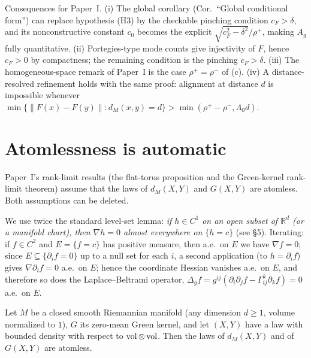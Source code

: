 \begin{remark}
Consequences for Paper~I. (i) The global corollary (Cor.\ ``Global conditional form'')
can replace hypothesis (H3) by the checkable pinching condition $c_F>\delta$, and its
nonconstructive constant $c_0$ becomes the explicit
$\sqrt{c_F^2-\delta^2}/\rho^+$, making $A_g$ fully quantitative. (ii) Portegies-type
mode counts give injectivity of $F$, hence $c_F>0$ by compactness; the remaining
condition is the pinching $c_F>\delta$. (iii) The homogeneous-space remark of Paper~I
is the case $\rho^+=\rho^-$ of (c). (iv) A distance-resolved refinement holds with the
same proof: alignment at distance $d$ is impossible whenever
$\min\{\lVert F(x)-F(y)\rVert:d_M(x,y)=d\}>\min(\rho^+-\rho^-,\Lambda_0 d)$.
\end{remark}

\section{Atomlessness is automatic}

Paper~I's rank-limit results (the flat-torus proposition and the Green-kernel rank-limit
theorem) assume that the laws of $d_M(X,Y)$ and $G(X,Y)$ are atomless. Both assumptions
can be deleted.

We use twice the standard level-set lemma: \emph{if $h\in C^1$ on an open subset of
$\mathbb R^d$ (or a manifold chart), then $\nabla h=0$ almost everywhere on
$\{h=c\}$} (see \S5). Iterating: if $f\in C^2$ and $E=\{f=c\}$ has positive measure,
then a.e.\ on $E$ we have $\nabla f=0$; since $E\subseteq\{\partial_i f=0\}$ up to a
null set for each $i$, a second application (to $h=\partial_i f$) gives
$\nabla\partial_i f=0$ a.e.\ on $E$; hence the coordinate Hessian vanishes a.e.\ on
$E$, and therefore so does the Laplace--Beltrami operator,
$\Delta_g f=g^{ij}(\partial_i\partial_j f-\Gamma^k_{ij}\partial_k f)=0$ a.e.\ on $E$.

\begin{lemma}\label{lem:atomless}
Let $M$ be a closed smooth Riemannian manifold (any dimension $d\ge1$, volume
normalized to $1$), $G$ its zero-mean Green kernel, and let $(X,Y)$ have a law with
bounded density with respect to $\operatorname{vol}\otimes\operatorname{vol}$. Then the laws of $d_M(X,Y)$ and of
$G(X,Y)$ are atomless.
\end{lemma}

